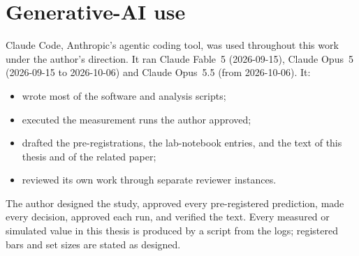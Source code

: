\section{Generative-AI use}
\label{sec:genai-thesis}

Claude Code, Anthropic's agentic coding tool, was used throughout this work
under the author's direction. It ran Claude Fable~5 (2026-09-15), Claude
Opus~5 (2026-09-15 to 2026-10-06) and Claude Opus~5.5 (from 2026-10-06). It:
\begin{itemize}
\item wrote most of the software and analysis scripts;
\item executed the measurement runs the author approved;
\item drafted the pre-registrations, the lab-notebook entries, and the text of
  this thesis and of the related paper;
\item reviewed its own work through separate reviewer instances.
\end{itemize}
The author designed the study, approved every pre-registered prediction, made
every decision, approved each run, and verified the text. Every measured or
simulated value in this thesis is produced by a script from the logs;
registered bars and set sizes are stated as designed.
